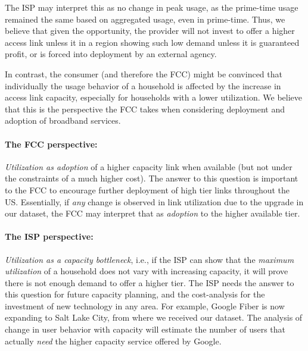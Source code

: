  The ISP may interpret this as no change in 
peak usage, as
the prime-time usage remained the same based on aggregated usage, even in 
prime-time. Thus, we
believe that given the opportunity, the provider will not invest to offer a 
higher access
link unless it in a region showing such low demand unless it is guaranteed 
profit, or is forced
into deployment by an external agency.

In contrast, the consumer (and therefore the FCC) might be convinced that 
individually
the usage behavior of a household is affected by the increase in access link
capacity, especially for households with a lower utilization. We believe that 
this is
the perspective the FCC takes when considering deployment and adoption of 
broadband services.

\paragraph{The FCC perspective: }\emph{Utilization as adoption} of a higher capacity
link when available (but not under the constraints of a much higher cost). The answer to this
question is important to the FCC to encourage further deployment of high tier links throughout
the US. Essentially, if \emph{any} change is observed in link utilization due to the upgrade in our dataset, the FCC may interpret that as \emph{adoption} to the higher available tier.

\paragraph{The ISP perspective: }\emph{Utilization as a capacity bottleneck}, i.e., if
the ISP can show that the \emph{maximum utilization} of a household does not vary
with increasing capacity, it will prove there is not enough demand to offer a higher tier.  
The ISP needs the answer to this question for future capacity planning, and the cost-analysis
for the investment of new technology in any area.
For example, Google Fiber is now expanding to Salt Lake City, from where we received our dataset.
The analysis of change in user behavior with capacity will estimate the number of users that
actually \emph{need} the higher capacity service offered by Google.